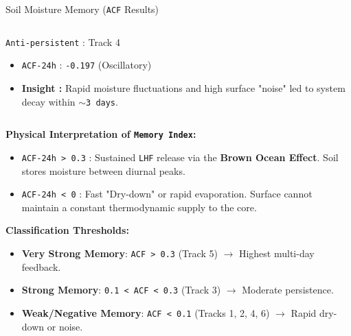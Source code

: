 \documentclass[8pt, aspectratio=169]{beamer}
\begin{document}
\begin{frame}{Soil Moisture Memory (\texttt{ACF} Results)}
\begin{columns}[T]
        \begin{block}{\footnotesize \texttt{Anti-persistent} : Track 4}
            \footnotesize
            \begin{itemize}
                \item \texttt{ACF-24h} : \texttt{-0.197} (Oscillatory)
                \item \textbf{Insight :} Rapid moisture fluctuations and high surface "noise" led to system decay within \texttt{$\sim$3 days}.
            \end{itemize}
        \end{block}
    \end{columns}

    \vspace{0.2cm}
    \footnotesize
    \textbf{Physical Interpretation of \texttt{Memory Index}:}
    \begin{itemize}
        \item \texttt{ACF-24h > 0.3} : Sustained \texttt{LHF} release via the \textbf{Brown Ocean Effect}. Soil stores moisture between diurnal peaks.
        \item \texttt{ACF-24h < 0} : Fast "Dry-down" or rapid evaporation. Surface cannot maintain a constant thermodynamic supply to the core.
    \end{itemize}

    \vspace{0.2cm}
    \footnotesize
    \textbf{Classification Thresholds:}
    \begin{itemize}
        \item \textbf{Very Strong Memory}: \texttt{ACF > 0.3} (Track 5) $\rightarrow$ Highest multi-day feedback.
        \item \textbf{Strong Memory}: \texttt{0.1 < ACF < 0.3} (Track 3) $\rightarrow$ Moderate persistence.
        \item \textbf{Weak/Negative Memory}: \texttt{ACF < 0.1} (Tracks 1, 2, 4, 6) $\rightarrow$ Rapid dry-down or noise.
    \end{itemize}
\end{frame}
\end{document}

